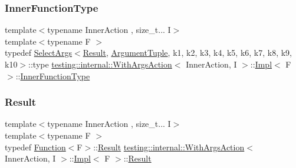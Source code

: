 \mbox{\label{classtesting_1_1internal_1_1_with_args_action_1_1_impl_ae7e21dae071e88eb5889c9d14e0b5212}} 
\subsubsection{\texorpdfstring{InnerFunctionType}{InnerFunctionType}}
{\footnotesize\ttfamily template$<$typename Inner\+Action , size\+\_\+t... I$>$ \\
template$<$typename F $>$ \\
typedef \mbox{\hyperlink{classtesting_1_1internal_1_1_select_args}{Select\+Args}}$<$\mbox{\hyperlink{classtesting_1_1_action_interface_a7477de2fe3e4e01c59db698203acaee7}{Result}}, \mbox{\hyperlink{classtesting_1_1_action_interface_af72720d864da4d606629e83edc003511}{Argument\+Tuple}}, k1, k2, k3, k4, k5, k6, k7, k8, k9, k10$>$\+::type \mbox{\hyperlink{structtesting_1_1internal_1_1_with_args_action}{testing\+::internal\+::\+With\+Args\+Action}}$<$ Inner\+Action, I $>$\+::\mbox{\hyperlink{classtesting_1_1internal_1_1_with_args_action_1_1_impl}{Impl}}$<$ F $>$\+::\mbox{\hyperlink{classtesting_1_1internal_1_1_with_args_action_1_1_impl_ae7e21dae071e88eb5889c9d14e0b5212}{Inner\+Function\+Type}}\hspace{0.3cm}{\ttfamily [private]}}

\mbox{\label{classtesting_1_1internal_1_1_with_args_action_1_1_impl_ab8a9af39768c3d6e1b879a3b96f228a4}} 
\subsubsection{\texorpdfstring{Result}{Result}}
{\footnotesize\ttfamily template$<$typename Inner\+Action , size\+\_\+t... I$>$ \\
template$<$typename F $>$ \\
typedef \mbox{\hyperlink{structtesting_1_1internal_1_1_function}{Function}}$<$F$>$\+::\mbox{\hyperlink{classtesting_1_1_action_interface_a7477de2fe3e4e01c59db698203acaee7}{Result}} \mbox{\hyperlink{structtesting_1_1internal_1_1_with_args_action}{testing\+::internal\+::\+With\+Args\+Action}}$<$ Inner\+Action, I $>$\+::\mbox{\hyperlink{classtesting_1_1internal_1_1_with_args_action_1_1_impl}{Impl}}$<$ F $>$\+::\mbox{\hyperlink{classtesting_1_1_action_interface_a7477de2fe3e4e01c59db698203acaee7}{Result}}}



